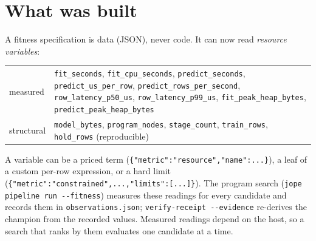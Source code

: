 \documentclass[10.5pt]{article}
\begin{document}
\section{What was built}
A fitness specification is data (JSON), never code. It can now read \emph{resource variables}:
\begin{center}\small
\begin{tabular}{@{}p{2.2cm}p{13.6cm}@{}}\toprule
measured & \texttt{fit\_seconds}, \texttt{fit\_cpu\_seconds}, \texttt{predict\_seconds}, \texttt{predict\_us\_per\_row}, \texttt{predict\_rows\_per\_second},
\texttt{row\_latency\_p50\_us}, \texttt{row\_latency\_p99\_us}, \texttt{fit\_peak\_heap\_bytes}, \texttt{predict\_peak\_heap\_bytes} \\
structural & \texttt{model\_bytes}, \texttt{program\_nodes}, \texttt{stage\_count}, \texttt{train\_rows}, \texttt{hold\_rows} (reproducible) \\\bottomrule
\end{tabular}
\end{center}
A variable can be a priced term (\texttt{\{"metric":"resource","name":...\}}), a leaf of a custom per-row expression, or a hard limit
(\texttt{\{"metric":"constrained",...,"limits":[...]\}}). The program search (\texttt{jope pipeline run -{}-fitness}) measures these
readings for every candidate and records them in \texttt{observations.json}; \texttt{verify-receipt -{}-evidence} re-derives the
champion from the recorded values. Measured readings depend on the host, so a search that ranks by them evaluates one
candidate at a time.
\end{document}
